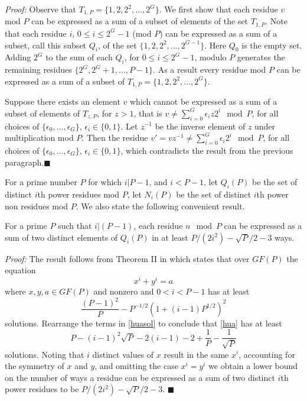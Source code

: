 \noindent \textit{Proof:} Observe that
$T_{1,P}=\{1,2,2^2,...,2^{G}\}$. We first show that each residue $v$
mod $P$ can be expressed as a sum of a subset of elements of the set
$T_{1,P}$. Note that each residue $i$, $0 \leq i \leq 2^G-1$ (mod
$P$) can be expressed as a sum of a subset, call this subset $Q_i$,
of the set $\{1,2,2^2,...,2^{G-1}\}$. Here $Q_0$ is the empty set.
Adding $2^G$ to the sum of each $Q_i$, for $0 \leq i \leq 2^G-1$,
modulo $P$ generates the remaining residues $\{2^G, 2^G+1,...,P-1
\}$. As a result every residue mod $P$ can be expressed as a sum of
a subset of $T_{1,P}=\{1,2,2^2,...,2^{G}\}$.

Suppose there exists an element $v$ which cannot be expressed as a
sum of a subset of elements of $T_{z,P}$, for $z>1$, that is $v \neq
\sum_{i=0}^G \epsilon_i z 2^i \mod P$, for all choices of
$\{\epsilon_0,...,\epsilon_G\}$, $\epsilon_i \in \{0,1\}$. Let
$z^{-1}$ be the inverse element of $z$ under multiplication mod $P$.
Then the residue $v' = vz^{-1} \neq \sum_{i=0}^G \epsilon_i 2^i \mod
P$, for all choices of $\{\epsilon_0,...,\epsilon_G\}$, $\epsilon_i
\in \{0,1\}$, which contradicts the result from the previous
paragraph.\hfill$\blacksquare$




For a prime number $P$ for which $i|P-1$, and $i<P-1$, let $Q_i(P)$
be the set of distinct $i$th power residues mod $P$, let $N_i(P)$ be
the set of distinct $i$th power non residues mod $P$. We also state
the following convenient result.
\begin{lemma}\label{sums1}
For a prime $P$ such that $i | (P-1)$, each residue $n \mod P$ can
be expressed as a sum of two distinct elements of $Q_i(P)$ in at
least $P/(2i^2)-\sqrt{P}/2-3$ ways.
\end{lemma}
\noindent \textit{Proof:} The result follows from Theorem II in
\cite{huavan:49} which states that over $GF(P)$ the equation
\begin{equation}\label{hua} x^i+y^i=a
\end{equation} where $x,y,a \in GF(P)$ and nonzero and $0 < i <P-1 $
has at least
\begin{equation}\label{huasol}\frac{(P-1)^2}{P}-P^{-1/2}\left(1+(i-1)P^{1/2}\right)^2\end{equation}
solutions. Rearrange the terms in \eqref{huasol} to conclude that
\eqref{hua} has at least \begin{equation}\label{huasol1}
P-(i-1)^2\sqrt{P}-2(i-1)-2+\frac{1}{P}-\frac{1}{\sqrt{P}}
\end{equation} solutions. Noting that $i$ distinct values of $x$ result
in the same $x^i$, accounting for the symmetry of $x$ and $y$, and
omitting the case $x^i=y^i$ we obtain a lower bound on the number of
ways a residue can be expressed as a sum of two distinct $i$th power
residues to be $P/(2i^2)-\sqrt{P}/2-3$. \hfill$\blacksquare$

